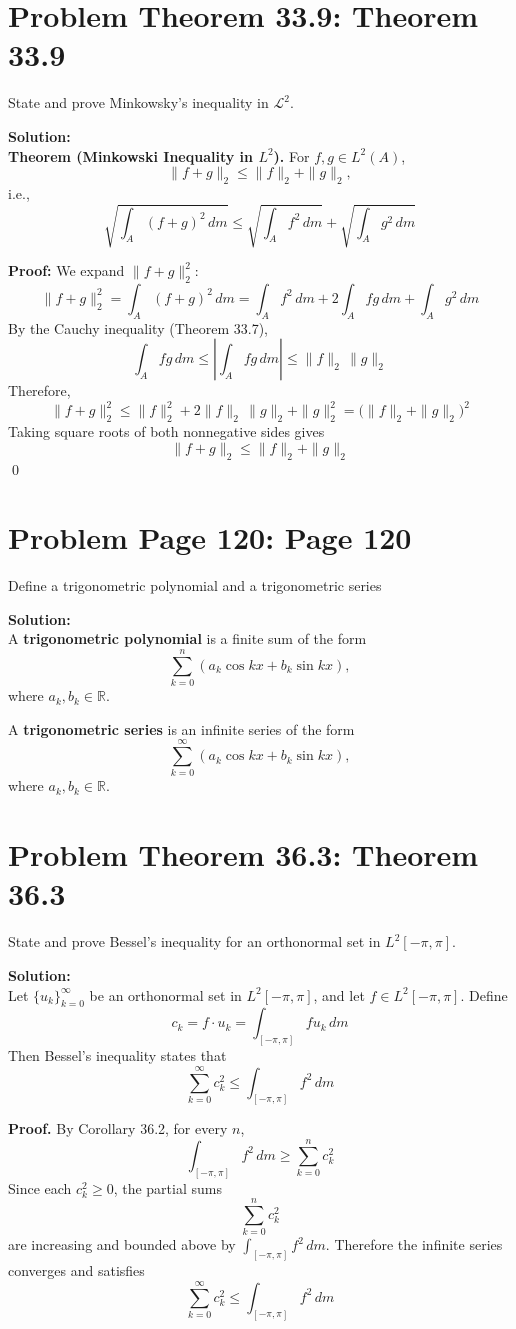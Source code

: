 \documentclass[a4paper]{article}
\theoremstyle{definition}
\newcounter{problem}
\newenvironment{problem}[1][]
{
    \stepcounter{problem}
    \section*{Problem \theproblem\ifx\relax#1\relax\else: #1\fi}
}
{}
\newenvironment{solution}
{
    \noindent\textbf{Solution:}\\
}
{
    
}
\begin{document}
\newpage
\begin{problem}[Theorem 33.9]
State and prove Minkowsky's inequality in $ \mathcal{L}^2 $.
\end{problem}

\vspace{2em}
\begin{solution}
\textbf{Theorem (Minkowski Inequality in $L^2$).}
For $f,g \in L^2(A)$,
\[
\|f+g\|_2 \le \|f\|_2 + \|g\|_2,
\]
i.e.,
\[
\sqrt{\int_A (f+g)^2 \, dm}
\le
\sqrt{\int_A f^2 \, dm}
+
\sqrt{\int_A g^2 \, dm}
\]

\textbf{Proof:}
We expand $\|f+g\|_2^2$:
\[
\|f+g\|_2^2
= \int_A (f+g)^2\,dm
= \int_A f^2\,dm + 2\int_A fg\,dm + \int_A g^2\,dm
\]
By the Cauchy inequality (Theorem 33.7),
\[
\int_A fg\,dm \le \left|\int_A fg\,dm\right| \le \|f\|_2\,\|g\|_2
\]
Therefore,
\[
\|f+g\|_2^2
\le \|f\|_2^2 + 2\|f\|_2\,\|g\|_2 + \|g\|_2^2
= \bigl(\|f\|_2 + \|g\|_2\bigr)^2
\]
Taking square roots of both nonnegative sides gives
\[
\|f+g\|_2 \le \|f\|_2 + \|g\|_2
\]
\qed
\end{solution}

\newpage
\begin{problem}[Page 120]
Define a trigonometric polynomial and a trigonometric series
\end{problem}

\vspace{2em}
\begin{solution}
A \textbf{trigonometric polynomial} is a finite sum of the form
\[
    \sum_{k=0}^{n} \left(a_k \cos kx + b_k \sin kx\right),
\]
where $a_k,b_k \in \mathbb{R}$.

\vspace{2em}
\noindent A \textbf{trigonometric series} is an infinite series of the form
\[
    \sum_{k=0}^{\infty} \left(a_k \cos kx + b_k \sin kx\right),
\]
where $a_k,b_k \in \mathbb{R}$.
\end{solution}

\newpage
\begin{problem}[Theorem 36.3]
State and prove Bessel's inequality for an orthonormal set in $L^2[-\pi,\pi]$.
\end{problem}

\vspace{2em}
\begin{solution}
Let $\{u_k\}_{k=0}^{\infty}$ be an orthonormal set in $L^2[-\pi,\pi]$, and let
$f \in L^2[-\pi,\pi]$. Define
\[
    c_k = f \cdot u_k = \int_{[-\pi,\pi]} f u_k \, dm
\]
Then Bessel's inequality states that
\[
    \sum_{k=0}^{\infty} c_k^2 \le \int_{[-\pi,\pi]} f^2 \, dm
\]

\textbf{Proof.}
By Corollary 36.2, for every $n$,
\[
    \int_{[-\pi,\pi]} f^2 \, dm \ge \sum_{k=0}^{n} c_k^2
\]
Since each $c_k^2 \ge 0$, the partial sums
\[
    \sum_{k=0}^{n} c_k^2
\]
are increasing and bounded above by $\int_{[-\pi,\pi]} f^2 \, dm$.
Therefore the infinite series converges and satisfies
\[
    \sum_{k=0}^{\infty} c_k^2 \le \int_{[-\pi,\pi]} f^2 \, dm
\]
\end{solution}
\end{document}
